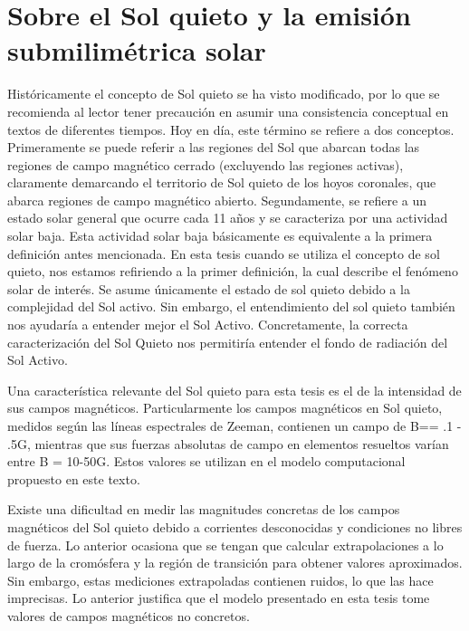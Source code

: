 \documentclass[9pt]{book}
\begin{document}
\section{Sobre el Sol quieto y la emisi\'on submilim\'etrica solar}
Hist\'oricamente el concepto de Sol quieto se ha visto modificado, por lo que se recomienda al lector tener precauci\'on en asumir una consistencia conceptual en textos de diferentes tiempos. Hoy en d\'ia, este t\'ermino se refiere a dos conceptos. Primeramente se puede referir a las regiones del Sol que abarcan todas las regiones de campo magn\'etico cerrado (excluyendo las regiones activas), claramente demarcando el territorio de Sol quieto de los hoyos coronales, que abarca regiones de campo magn\'etico abierto.
Segundamente, se refiere a un estado solar general que ocurre cada 11 a\~nos y se caracteriza por una actividad solar baja. Esta actividad solar baja b\'asicamente es equivalente a la primera definici\'on antes mencionada. En esta tesis cuando se utiliza el concepto de sol quieto, nos estamos refiriendo a la primer definici\'on, la cual describe el fen\'omeno solar de inter\'es. Se asume \'unicamente el estado de sol quieto debido a la complejidad del Sol activo. Sin embargo, el entendimiento del sol quieto tambi\'en nos ayudar\'ia a entender mejor el Sol Activo. Concretamente, la correcta caracterizaci\'on del Sol Quieto nos permitir\'ia entender el fondo de radiaci\'on del Sol Activo.

Una caracter\'istica relevante del Sol quieto para esta tesis es el de la intensidad de sus campos magn\'eticos. Particularmente los campos magn\'eticos en Sol quieto, medidos seg\'un las l\'ineas espectrales de Zeeman, contienen un campo de B== .1 - .5G, mientras que sus fuerzas absolutas de campo en elementos resueltos var\'ian entre B = 10-50G. Estos valores se utilizan en el modelo computacional propuesto en este texto.

Existe una dificultad en medir las magnitudes concretas de los campos magn\'eticos del Sol quieto debido a corrientes desconocidas y condiciones no libres de fuerza. Lo anterior ocasiona que se tengan que calcular extrapolaciones a lo largo de la crom\'osfera y la regi\'on de transici\'on para obtener valores aproximados. Sin embargo, estas mediciones extrapoladas contienen ruidos, lo que las hace imprecisas. Lo anterior justifica que el modelo presentado en esta tesis tome valores de campos magn\'eticos no concretos.
\end{document}
